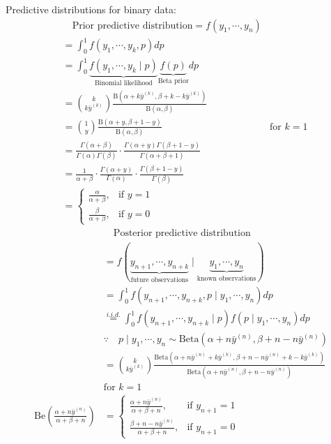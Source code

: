 \documentclass{article}\usepackage[]{graphicx}\usepackage[]{xcolor}
\begin{document}
\begin{multicols*}{2}
Predictive distributions for binary data:
\begin{align*}
    &\quad \text{Prior predictive distribution}=f(y_1,\cdots, y_n) \\
    &=\int_{0}^{1}f(y_1,\cdots,y_k,p)dp \\
    &=\int_{0}^{1}\underbrace{f(y_1,\cdots,y_k\mid p)}_\text{Binomial likelihood}
    \underbrace{f(p)}_\text{Beta prior}dp \\
    &=\binom{k}{k\bar{y}^{(k)}}\frac{\text{B}(\alpha+k\bar{y}^{(k)},\beta+k-k\bar{y}^{(k)})}{\text{B}(\alpha,\beta)} \\
    &=\binom{1}{y}\frac{\text{B}(\alpha+y,\beta+1-y)}{\text{B}(\alpha,\beta)} & \text{for $k=1$} \\
    &=\frac{\Gamma(\alpha+\beta)}{\Gamma(\alpha)\Gamma(\beta)}\cdot
    \frac{\Gamma(\alpha+y)\Gamma(\beta+1-y)}{\Gamma(\alpha+\beta+1)} \\
    &=\frac{1}{\alpha+\beta}\cdot\frac{\Gamma(\alpha+y)}{\Gamma(\alpha)}\cdot\frac{\Gamma(\beta+1-y)}{\Gamma(\beta)} \\
    &=\begin{cases}
    \frac{\alpha}{\alpha+\beta}, & \text{if } y=1 \\
    \frac{\beta}{\alpha+\beta}, & \text{if } y=0
    \end{cases}
\end{align*}
\begin{align*}
    &\quad\text{Posterior predictive distribution} \\
    &=f(\underbrace{y_{n+1},\cdots,y_{n+k}}_\text{future observations}\mid \underbrace{y_1,\cdots, y_n}_\text{known observations}) \\
    &=\int_{0}^{1}f(y_{n+1},\cdots,y_{n+k},p\mid y_1,\cdots,y_n)dp \\
    &\overset{i.i.d.}{=}\int_0^1 f(y_{n+1},\cdots,y_{n+k}\mid p) f(p\mid y_1,\cdots,y_n)dp \\
    &\because\quad p\mid y_1,\cdots,y_n\sim\text{Beta}(\alpha+n\bar{y}^{(n)},\beta+n-n\bar{y}^{(n)}) \\
    &=\binom{k}{k\bar{y}^{(k)}}
    \frac{\text{Beta}(\alpha+n\bar{y}^{(n)}+k\bar{y}^{(k)},\beta+n-n\bar{y}^{(n)}+k-k\bar{y}^{(k)})}
    {\text{Beta}(\alpha+n\bar{y}^{(n)},\beta+n-n\bar{y}^{(n)})} \\
    & \text{for $k=1$} \\
    \text{Be}\left(\frac{\alpha+n\bar{y}^{(n)}}{\alpha+\beta+n} \right)
    &=\begin{cases}
    \frac{\alpha+n\bar{y}^{(n)}}{\alpha+\beta+n},  & \text{if } y_{n+1}=1 \\
    \frac{\beta+n-n\bar{y}^{(n)}}{\alpha+\beta+n}, & \text{if } y_{n+1}=0
    \end{cases}
\end{align*}


\end{multicols*}
\end{document}
